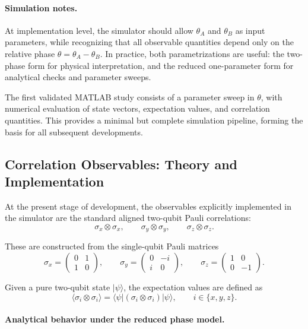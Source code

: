\documentclass[a4paper]{article}
\begin{document}
\paragraph{Simulation notes.}
At implementation level, the simulator should allow \(\theta_A\) and \(\theta_B\) as input parameters, while recognizing that all observable quantities depend only on the relative phase \(\theta=\theta_A-\theta_B\). In practice, both parametrizations are useful: the two-phase form for physical interpretation, and the reduced one-parameter form for analytical checks and parameter sweeps.

The first validated MATLAB study consists of a parameter sweep in \(\theta\), with numerical evaluation of state vectors, expectation values, and correlation quantities. This provides a minimal but complete simulation pipeline, forming the basis for all subsequent developments.

\subsection{Correlation Observables: Theory and Implementation}

At the present stage of development, the observables explicitly implemented in the simulator are the standard aligned two-qubit Pauli correlations:
\[
\sigma_x \otimes \sigma_x,\qquad
\sigma_y \otimes \sigma_y,\qquad
\sigma_z \otimes \sigma_z.
\]

These are constructed from the single-qubit Pauli matrices
\[
\sigma_x=
\begin{pmatrix}
0 & 1\\
1 & 0
\end{pmatrix},
\qquad
\sigma_y=
\begin{pmatrix}
0 & -i\\
i & 0
\end{pmatrix},
\qquad
\sigma_z=
\begin{pmatrix}
1 & 0\\
0 & -1
\end{pmatrix}.
\]

Given a pure two-qubit state \( |\psi\rangle \), the expectation values are defined as
\[
\langle \sigma_i \otimes \sigma_i \rangle
=
\langle \psi|
(\sigma_i \otimes \sigma_i)
|\psi\rangle,
\qquad i\in\{x,y,z\}.
\]

\paragraph{Analytical behavior under the reduced phase model.}
\end{document}
